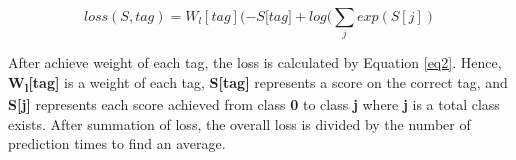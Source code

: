 \begin{CJK*}{UTF8}{min}
\begin{equation} \label{eq2}
\mathit{loss(S,tag)} = W_l[\mathit{tag}](- \mathit{S[tag}] + log(\sum_{\mathit{j}} \mathit{exp(S[j])}
\end{equation}

After achieve weight of each tag, the loss is calculated by Equation \ref{eq2}. 
Hence, \textbf{W\textsubscript{l}[tag]} is a weight of each tag, \textbf{S[tag]} represents a score on the correct tag, and \textbf{S[j]} represents each score achieved from class \textbf{0} to class \textbf{j} where \textbf{j} is a total class exists.
After summation of loss, the overall loss is divided by the number of prediction times to find an average.
\end{CJK*}